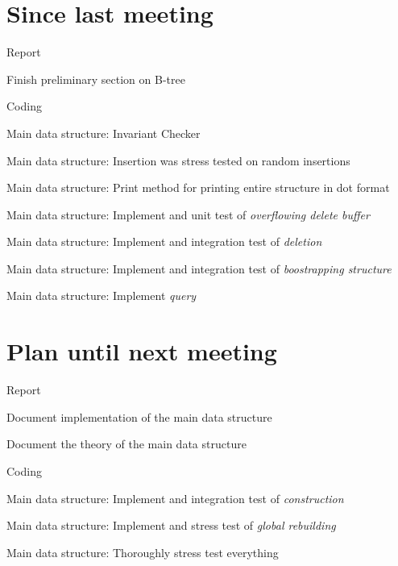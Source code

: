 \documentclass[a4paper,11pt,agenda,chair]{meetingmins}
\begin{document}
\maketitle

\section{Since last meeting}
\begin{items}
\item Report
	\begin{items}
		\item Finish preliminary section on B-tree
	\end{items}
\item Coding
	\begin{items}
		\item Main data structure: Invariant Checker
		\item Main data structure: Insertion was stress tested on random insertions
		\item Main data structure: Print method for printing entire structure in dot format
		\item Main data structure: Implement and unit test of \textit{overflowing delete buffer}
		\item Main data structure: Implement and integration test of \textit{deletion}
		\item Main data structure: Implement and integration test of \textit{boostrapping structure}
		\item Main data structure: Implement \textit{query}
	\end{items}
\end{items}

\section{Plan until next meeting}
\begin{items}
\item Report
	\begin{items}
		\item Document implementation of the main data structure
		\item Document the theory of the main data structure
	\end{items}
\item Coding
	\begin{items}
		\item Main data structure: Implement and integration test of \textit{construction}
		\item Main data structure: Implement and stress test of \textit{global rebuilding}
		\item Main data structure: Thoroughly stress test everything
	\end{items}
\end{items}
\end{document}
